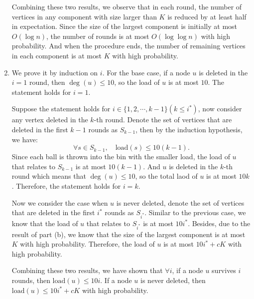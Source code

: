 \begin{answer}
\begin{enumerate}[label=\alph*).]
        Combining these two results, we observe that in each round, the number of vertices in any component with size larger than $K$ is reduced by at least half in expectation. Since the size of the largest component is initially at most $O(\log n)$, the number of rounds is at most $O(\log \log n)$ with high probability. And when the procedure ends, the number of remaining vertices in each component is at most $K$ with high probability.
        \item We prove it by induction on $i$. For the base case, if a node $u$ is deleted in the $i=1$ round, then $\deg(u) \le 10$,  so the load of $u$ is at most $10$. The statement holds for $i=1$.
        
        Suppose the statement holds for $i \in \{1,2,\cdots, k-1\}(k\le i^*)$, now consider any vertex deleted in the $k$-th round. Denote the set of vertices that are deleted in the first $k-1$ rounds as $S_{k-1}$, then by 
        the induction hypothesis, we have:
        \begin{equation*}
            \forall s \in S_{k-1},\quad  \text{load}(s) \le 10(k-1).
        \end{equation*}
        Since each ball is thrown into the bin with the smaller load, the load of $u$ that relates to $S_{k-1}$ is at most $10(k-1)$. 
        And $u$ is deleted in the $k$-th round which means that $\deg(u) \le 10$, so the total laod of $u$ is at most $10k$. Therefore, the statement holds for $i=k$.

        Now we consider the case when $u$ is never deleted, denote the set of vertices that are deleted in the first $i^*$ rounds as $S_{i^*}$. Similar to the previous case, we know that 
        the load of $u$ that relates to $S_{i^*}$ is at most $10i^*$. Besides, due to the result of part (b), we know that the size of the largest component is at most $K$ with high probability.
        Therefore, the load of $u$ is at most $10i^* + cK$ with high probability.

        Combining these two results, we have shown that $\forall i$, if a node $u$ survives $i$ rounds, then $\mathrm{load}(u)\leq 10 i$. If a node $u$ is never deleted, then $\mathrm{load}(u)\leq 10i^* + cK$ with high probability.
    \end{enumerate}
    \ed
\end{answer}